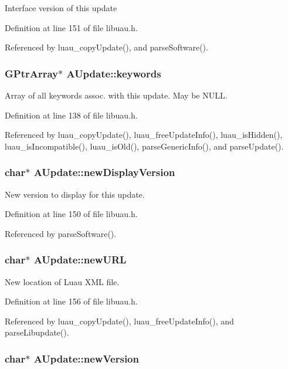 Interface version of this update 

Definition at line 151 of file libuau.h.

Referenced by luau\_\-copy\-Update(), and parse\-Software().
\subsubsection{\setlength{\rightskip}{0pt plus 5cm}GPtr\-Array$\ast$ {\bf AUpdate::keywords}}\label{structAUpdate_o1}


Array of all keywords assoc. with this update. May be NULL. 

Definition at line 138 of file libuau.h.

Referenced by luau\_\-copy\-Update(), luau\_\-free\-Update\-Info(), luau\_\-is\-Hidden(), luau\_\-is\-Incompatible(), luau\_\-is\-Old(), parse\-Generic\-Info(), and parse\-Update().
\subsubsection{\setlength{\rightskip}{0pt plus 5cm}char$\ast$ {\bf AUpdate::new\-Display\-Version}}\label{structAUpdate_o10}


New version to display for this update. 

Definition at line 150 of file libuau.h.

Referenced by parse\-Software().
\subsubsection{\setlength{\rightskip}{0pt plus 5cm}char$\ast$ {\bf AUpdate::new\-URL}}\label{structAUpdate_o12}


New location of Luau XML file. 

Definition at line 156 of file libuau.h.

Referenced by luau\_\-copy\-Update(), luau\_\-free\-Update\-Info(), and parse\-Libupdate().
\subsubsection{\setlength{\rightskip}{0pt plus 5cm}char$\ast$ {\bf AUpdate::new\-Version}}\label{structAUpdate_o9}


